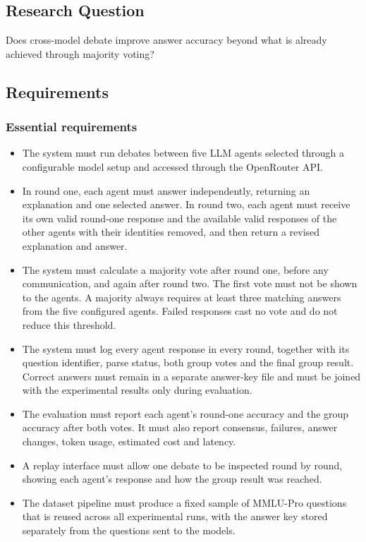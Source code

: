 \documentclass[12pt,a4paper]{article}
\begin{document}
\subsection{Research Question}


    Does cross-model debate improve answer accuracy beyond what is already achieved through majority voting?


\subsection{Requirements}

\subsubsection*{Essential requirements}

\begin{itemize}
    \item The system must run debates between five LLM agents selected through
    a configurable model setup and accessed through the OpenRouter API.

    \item In round one, each agent must answer independently, returning an
    explanation and one selected answer. In round two, each agent must receive
    its own valid round-one response and the available valid responses of the
    other agents with their identities removed, and then return a revised
    explanation and answer.

    \item The system must calculate a majority vote after round one, before any
    communication, and again after round two. The first vote must not be shown
    to the agents. A majority always requires at least three matching answers
    from the five configured agents. Failed responses cast no vote and do not
    reduce this threshold.

    \item The system must log every agent response in every round, together with
    its question identifier, parse status, both group votes and the final group
    result. Correct answers must remain in a separate answer-key file and must
    be joined with the experimental results only during evaluation.

    \item The evaluation must report each agent's round-one accuracy and the
    group accuracy after both votes. It must also report consensus, failures,
    answer changes, token usage, estimated cost and latency.

    \item A replay interface must allow one debate to be inspected round by
    round, showing each agent's response and how the group result was reached.

    \item The dataset pipeline must produce a fixed sample of MMLU-Pro questions
    that is reused across all experimental runs, with the answer key stored
    separately from the questions sent to the models.
\end{itemize}
\end{document}
